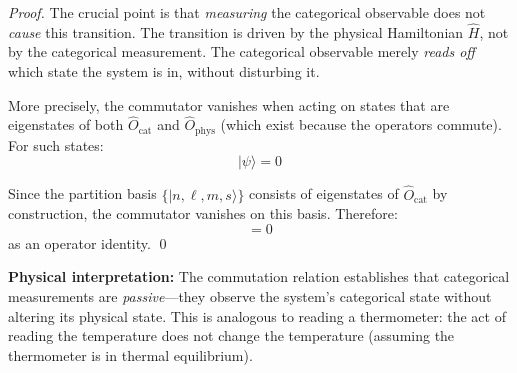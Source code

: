 \documentclass[twocolumn,10pt]{article}
\theoremstyle{remark}
\begin{document}
\begin{proof}
The crucial point is that \textit{measuring} the categorical observable does not \textit{cause} this transition. The transition is driven by the physical Hamiltonian $\hat{H}$, not by the categorical measurement. The categorical observable merely \textit{reads off} which state the system is in, without disturbing it.

More precisely, the commutator vanishes when acting on states that are eigenstates of both $\hat{O}_{\text{cat}}$ and $\hat{O}_{\text{phys}}$ (which exist because the operators commute). For such states:
\begin{equation}
    [\hat{O}_{\text{cat}}, \hat{O}_{\text{phys}}] |\psi\rangle = 0
    \label{eq:commutator_on_eigenstates}
\end{equation}

Since the partition basis $\{|n, \ell, m, s\rangle\}$ consists of eigenstates of $\hat{O}_{\text{cat}}$ by construction, the commutator vanishes on this basis. Therefore:
\begin{equation}
    [\hat{O}_{\text{cat}}, \hat{O}_{\text{phys}}] = 0
\end{equation}
as an operator identity. \qed
\end{proof}

\textbf{Physical interpretation:} The commutation relation establishes that categorical measurements are \textit{passive}—they observe the system's categorical state without altering its physical state. This is analogous to reading a thermometer: the act of reading the temperature does not change the temperature (assuming the thermometer is in thermal equilibrium).
\end{document}
